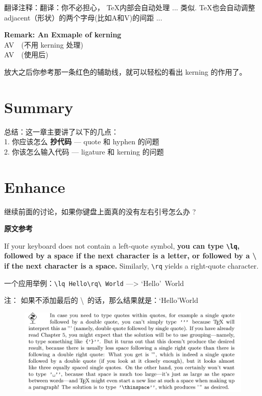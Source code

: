 \documentclass[fontset=windows, 12pt]{article}
\newcommand{\trans}[1]{\songti 翻译注释：#1}
\begin{document}
\trans{翻译：你不必担心， \TeX 内部会自动处理  ... 类似. \TeX 也会自动调整adjacent（形状）的两个字母(比如A和V)的间距 ...}

\textbf{Remark: An Exmaple of kerning}\\
{A}V~~(不用 kerning 处理)\\
AV~~(使用后)

放大之后你参考那一条红色的辅助线，就可以轻松的看出 kerning 的作用了。


\section{Summary}

总结：这一章主要讲了以下的几点：\\
1. 你应该怎么 \textbf{抄代码} --- quote 和 hyphen 的问题\\
2. 你该怎么输入代码 --- ligature 和 kerning 的问题


\section{Enhance}
\lhdbend  继续前面的讨论，如果你键盘上面真的没有左右引号怎么办 ?

\bigskip
{\bf 原文参考}

If your keyboard does not contain a left-quote symbol, {\bf you can type \verb |\lq|,
followed by a space if the next character is a letter, or followed by a \textbackslash{} if the
next character is a space.} Similarly, \verb |\rq| yields a right-quote character.


一个应用举例：\verb |\lq Hello\rq\ World| ---> \lq Hello\rq\ World

注： 如果不添加最后的 \textbackslash\ 的话，那么结果就是：\lq Hello\rq World


\begin{figure}[!htb]
    \centering
    \includegraphics[scale=0.65]{./Pic/quote.png}
    \label{quote}
\end{figure}


\vspace*{10em}
\centering
{}
\end{document}
